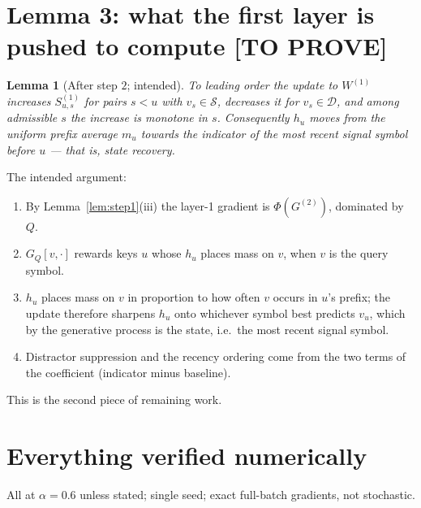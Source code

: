 \documentclass[11pt,a4paper]{article}
\theoremstyle{plain}
\newtheorem{lemma}{Lemma}
\theoremstyle{definition}
\newcommand{\TODO}{\textcolor{BrickRed}{\textbf{[TO PROVE]}}}
\newcommand{\Sig}{\mathcal{S}}
\newcommand{\Dis}{\mathcal{D}}
\newcommand{\1}{\mathbf{1}}
\begin{document}
\section{Lemma 3: what the first layer is pushed to compute \quad \TODO}

\begin{lemma}[After step $2$; intended]\label{lem:step2}
To leading order the update to $W^{(1)}$ increases $S^{(1)}_{u,s}$ for pairs $s<u$ with
$v_s\in\Sig$, decreases it for $v_s\in\Dis$, and among admissible $s$ the increase is monotone in
$s$. Consequently $h_u$ moves from the uniform prefix average $m_u$ towards the indicator of the
most recent signal symbol before $u$ --- that is, state recovery.
\end{lemma}

\noindent The intended argument:
\begin{enumerate}[nosep]
\item By Lemma~\ref{lem:step1}(iii) the layer-1 gradient is $\Phi(G^{(2)})$, dominated by $Q$.
\item $G_Q[v,\cdot]$ rewards keys $u$ whose $h_u$ places mass on $v$, when $v$ is the query symbol.
\item $h_u$ places mass on $v$ in proportion to how often $v$ occurs in $u$'s prefix; the update
therefore sharpens $h_u$ onto whichever symbol best predicts $v_u$, which by the generative process
is the state, i.e.\ the most recent signal symbol.
\item Distractor suppression and the recency ordering come from the two terms of the coefficient
(indicator minus baseline).
\end{enumerate}

\noindent This is the second piece of remaining work.

\section{Everything verified numerically}

All at $\alpha=0.6$ unless stated; single seed; exact full-batch gradients, not stochastic.
\end{document}
